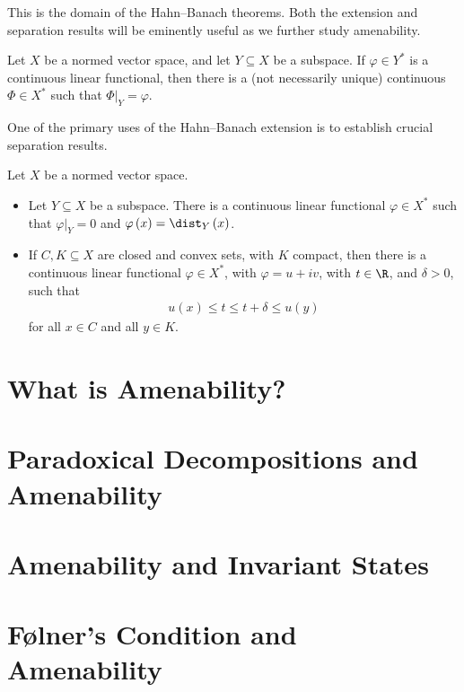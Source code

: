 \documentclass[10pt]{mypackage2}
\begin{document}
This is the domain of the Hahn--Banach theorems. Both the extension and separation results will be eminently useful as we further study amenability.
\begin{theorem}\label{thm:hahn_banach_extension}
  Let $X$ be a normed vector space, and let $Y\subseteq X$ be a subspace. If $\varphi\in Y^{\ast}$ is a continuous linear functional, then there is a (not necessarily unique) continuous $\Phi\in X^{\ast}$ such that $\Phi|_{Y} = \varphi$.
\end{theorem}
One of the primary uses of the Hahn--Banach extension is to establish crucial separation results.
\begin{theorem}\label{thm:hahn_banach_separation}
  Let $X$ be a normed vector space. 
  \begin{itemize}
    \item Let $Y\subseteq X$ be a subspace. There is a continuous linear functional $\varphi\in X^{\ast}$ such that $\varphi|_{Y} = 0$ and $\varphi\left( x \right) = \dist_{Y}\left( x \right)$.
    \item If $C,K\subseteq X$ are closed and convex sets, with $K$ compact, then there is a continuous linear functional $\varphi\in X^{\ast}$, with $\varphi = u + iv$, with $t\in \R$, and $\delta > 0$, such that
      \begin{align*}
        u(x) \leq t \leq t + \delta \leq u(y)
      \end{align*}
      for all $x\in C$ and all $y\in K$.
  \end{itemize}
\end{theorem}

\section{What is Amenability?}\label{sec:intro_amenability}%
\section{Paradoxical Decompositions and Amenability}\label{sec:banach_tarski_tarskis_theorem}%
\section{Amenability and Invariant States}\label{sec:invariant_states}%
\section{Følner's Condition and Amenability}\label{sec:folner_condition}%
\end{document}
